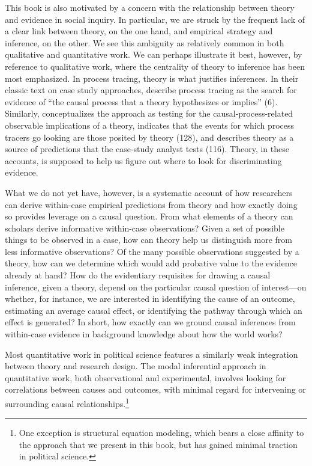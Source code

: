 \documentclass[12pt,]{book}
\let\rmarkdownfootnote\footnote%
\def\footnote{\protect\rmarkdownfootnote}
\begin{document}
This book is also motivated by a concern with the relationship between theory and evidence in social inquiry. In particular, we are struck by the frequent lack of a clear link between theory, on the one hand, and empirical strategy and inference, on the other. We see this ambiguity as relatively common in both qualitative and quantitative work. We can perhaps illustrate it best, however, by reference to qualitative work, where the centrality of theory to inference has been most emphasized. In process tracing, theory is what justifies inferences. In their classic text on case study approaches, \citet{george2005case} describe process tracing as the search for evidence of ``the causal process that a theory hypothesizes or implies'' (6). Similarly, \citet{Hall2003aligning} conceptualizes the approach as testing for the causal-process-related observable implications of a theory, \citet{mahoney2010after} indicates that the events for which process tracers go looking are those posited by theory (128), and \citet{gerring2006case} describes theory as a source of predictions that the case-study analyst tests (116). Theory, in these accounts, is supposed to help us figure out where to look for discriminating evidence.

What we do not yet have, however, is a systematic account of how researchers can derive within-case empirical predictions from theory and how exactly doing so provides leverage on a causal question. From what elements of a theory can scholars derive informative within-case observations? Given a set of possible things to be observed in a case, how can theory help us distinguish more from less informative observations? Of the many possible observations suggested by a theory, how can we determine which would add probative value to the evidence already at hand? How do the evidentiary requisites for drawing a causal inference, given a theory, depend on the particular causal question of interest---on whether, for instance, we are interested in identifying the cause of an outcome, estimating an average causal effect, or identifying the pathway through which an effect is generated? In short, how exactly can we ground causal inferences from within-case evidence in background knowledge about how the world works?

Most quantitative work in political science features a similarly weak integration between theory and research design. The modal inferential approach in quantitative work, both observational and experimental, involves looking for correlations between causes and outcomes, with minimal regard for intervening or surrounding causal relationships.\footnote{One exception is structural equation modeling, which bears a close affinity to the approach that we present in this book, but has gained minimal traction in political science.}
\end{document}
